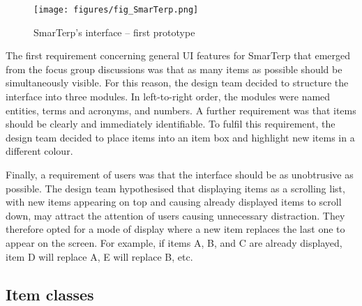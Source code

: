 \begin{figure}
    \texttt{[image: figures/fig\_SmarTerp.png]}
    \caption{SmarTerp's interface -- first prototype \label{fig:8}}
\end{figure}

\begin{sloppypar}
The first requirement concerning general UI features for SmarTerp that emerged from the focus group discussions was that as many items as possible should be simultaneously visible. For this reason, the design team decided to structure the interface into three modules. In left-to-right order, the modules were named entities, terms and acronyms, and numbers.
A further requirement was that items should be clearly and immediately identifiable. To fulfil this requirement, the design team decided to place items into an item box and highlight new items in a different colour.
\end{sloppypar}

Finally, a requirement of users was that the interface should be as unobtrusive as possible. The design team hypothesised that displaying items as a scrolling list, with new items appearing on top and causing already displayed items to scroll down, may attract the attention of users causing unnecessary distraction. They therefore opted for a mode of display where a new item replaces the last one to appear on the screen. For example, if items A, B, and C are already displayed, item D will replace A, E will replace B, etc.

\subsection{Item classes}

